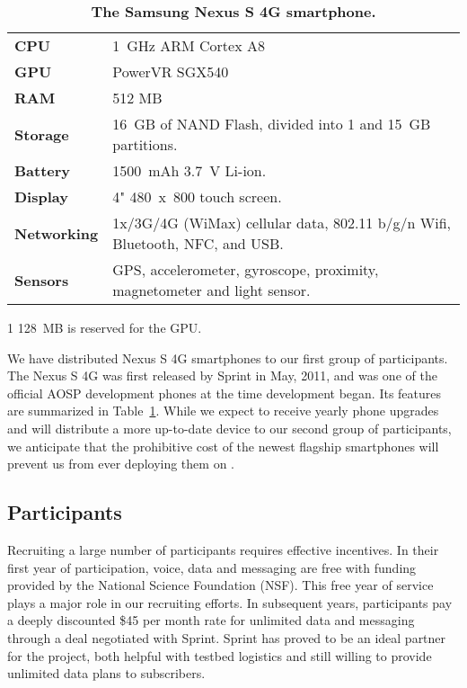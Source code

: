 \begin{table}[t]
\vspace*{0.19in}
\begin{threeparttable}
\begin{tabularx}{\columnwidth}{lX}
\toprule
\textbf{CPU} & 1~GHz ARM Cortex A8 \\
\textbf{GPU} & PowerVR SGX540 \\
\textbf{RAM} & 512 MB\tnote{1} \\
\textbf{Storage} & 16~GB of NAND Flash, divided into 1 and 15~GB partitions.\\
\textbf{Battery} & \num{1500}~mAh 3.7~V Li-ion.\\
\textbf{Display} & 4" 480~x~800 touch screen.\\
\textbf{Networking} & 1x/3G/4G (WiMax) cellular data, 802.11 b/g/n Wifi,
Bluetooth, NFC, and USB.\\
\textbf{Sensors} & GPS, accelerometer, gyroscope, proximity, magnetometer and light sensor.\\
\bottomrule
\end{tabularx}

{\footnotesize
\begin{tablenotes}
\item [1] 128~MB is reserved for the GPU.
\end{tablenotes}}

\caption{\textbf{The Samsung Nexus S 4G smartphone.}}
\label{table-nexuss4g}
\end{threeparttable}
\end{table}

We have distributed Nexus S 4G smartphones to our first group of
participants. The Nexus S 4G was first released by Sprint in May, 2011, and
was one of the official AOSP development phones at the time \PhoneLab{}
development began. Its features are summarized in Table~\ref{table-nexuss4g}.
While we expect to receive yearly phone upgrades and will distribute a more
up-to-date device to our second group of participants, we anticipate that the
prohibitive cost of the newest flagship smartphones will prevent us from ever
deploying them on \PhoneLab{}.

\subsection{Participants}


Recruiting a large number of \PhoneLab{} participants requires effective
incentives. In their first year of \PhoneLab{} participation, voice, data and
messaging are free with funding provided by the National Science Foundation
(NSF). This free year of service plays a major role in our recruiting
efforts. In subsequent years, participants pay a deeply discounted \$45 per
month rate for unlimited data and messaging through a deal negotiated with
Sprint. Sprint has proved to be an ideal partner for the \PhoneLab{} project,
both helpful with testbed logistics and still willing to provide unlimited
data plans to subscribers.

